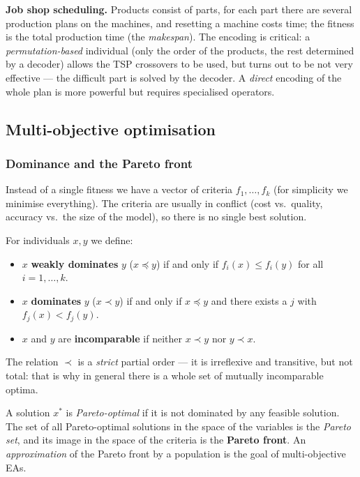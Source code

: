 \documentclass[11pt,a4paper]{article}
\theoremstyle{definition}
\begin{document}
\textbf{Job shop scheduling.} Products consist of parts, for each part there are several
production plans on the machines, and resetting a machine costs time; the fitness is the
total production time (the \emph{makespan}). The encoding is critical: a
\emph{permutation-based} individual (only the order of the products, the rest determined by a
decoder) allows the TSP crossovers to be used, but turns out to be not very effective --- the
difficult part is solved by the decoder. A \emph{direct} encoding of the whole plan is more
powerful but requires specialised operators.

\subsection{Multi-objective optimisation}
\label{sec:moea}

\subsubsection{Dominance and the Pareto front}

Instead of a single fitness we have a vector of criteria $f_1,\dots,f_k$ (for
simplicity we minimise everything). The criteria are usually in conflict (cost
vs.\ quality, accuracy vs.\ the size of the model), so there is no single best
solution.

\begin{defbox}[Dominance]
For individuals $x, y$ we define:
\begin{itemize}
\item $x$ \textbf{weakly dominates} $y$ ($x \preceq y$) if and only if
  $f_i(x) \le f_i(y)$ for all $i = 1,\dots,k$.
\item $x$ \textbf{dominates} $y$ ($x \prec y$) if and only if $x \preceq y$ and
  there exists a $j$ with $f_j(x) < f_j(y)$.
\item $x$ and $y$ are \textbf{incomparable} if neither $x \prec y$ nor
  $y \prec x$.
\end{itemize}
The relation $\prec$ is a \emph{strict} partial order --- it is irreflexive and
transitive, but not total: that is why in general there is a whole set of
mutually incomparable optima.
\end{defbox}

\begin{defbox}
A solution $x^*$ is \emph{Pareto-optimal} if it is not dominated by any feasible
solution. The set of all Pareto-optimal solutions in the space of the variables
is the \emph{Pareto set}, and its image in the space of the criteria is the
\textbf{Pareto front}. An \emph{approximation} of the Pareto front by a
population is the goal of multi-objective EAs.
\end{defbox}
\end{document}
